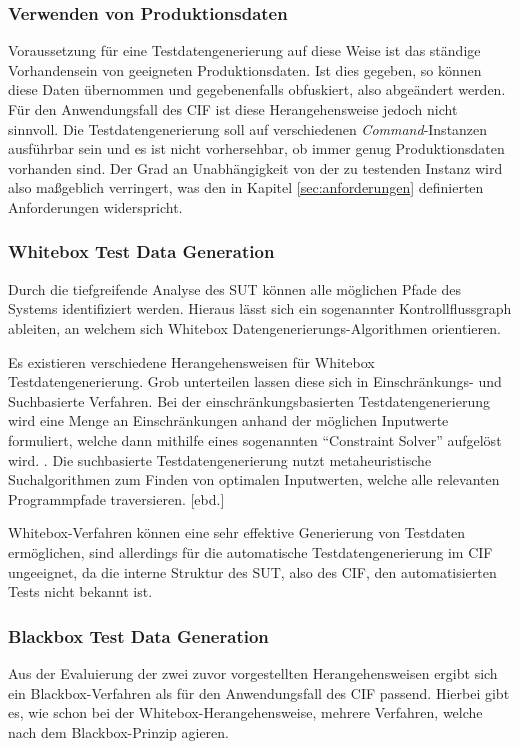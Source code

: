 \subsubsection*{Verwenden von Produktionsdaten}
Voraussetzung für eine Testdatengenerierung auf diese Weise ist das ständige Vorhandensein von geeigneten Produktionsdaten. Ist dies gegeben, so können diese Daten übernommen und gegebenenfalls obfuskiert, also abgeändert werden. \cite[S. 240]{witte:2019} Für den Anwendungsfall des \ac{CIF} ist diese Herangehensweise jedoch nicht sinnvoll. Die Testdatengenerierung soll auf verschiedenen \textit{Command}-Instanzen ausführbar sein und es ist nicht vorhersehbar, ob immer genug Produktionsdaten vorhanden sind. Der Grad an Unabhängigkeit von der zu testenden Instanz wird also maßgeblich verringert, was den in Kapitel \ref{sec:anforderungen} definierten Anforderungen widerspricht.

\subsubsection*{Whitebox Test Data Generation}
 Durch die tiefgreifende Analyse des \ac{SUT} können alle möglichen Pfade des Systems identifiziert werden. Hieraus lässt sich ein sogenannter Kontrollflussgraph ableiten, an welchem sich Whitebox Datengenerierungs-Algorithmen orientieren. \cite[S. 32]{nimpa:2016}

 Es existieren verschiedene Herangehensweisen für Whitebox Testdatengenerierung. Grob unterteilen lassen diese sich in Einschränkungs- und Suchbasierte Verfahren. Bei der einschränkungsbasierten Testdatengenerierung wird eine Menge an Einschränkungen anhand der möglichen Inputwerte formuliert, welche dann mithilfe eines sogenannten \enquote{Constraint Solver} aufgelöst wird. \cite[S. 33]{nimpa:2016}. Die suchbasierte Testdatengenerierung nutzt metaheuristische Suchalgorithmen zum Finden von optimalen Inputwerten, welche alle relevanten Programmpfade traversieren. [ebd.]

 Whitebox-Verfahren können eine sehr effektive Generierung von Testdaten ermöglichen, sind allerdings für die automatische Testdatengenerierung im \ac{CIF} ungeeignet, da die interne Struktur des \ac{SUT}, also des \ac{CIF}, den automatisierten Tests nicht bekannt ist.

\subsubsection*{Blackbox Test Data Generation}
Aus der Evaluierung der zwei zuvor vorgestellten Herangehensweisen ergibt sich ein Blackbox-Verfahren als für den Anwendungsfall des \ac{CIF} passend. Hierbei gibt es, wie schon bei der Whitebox-Herangehensweise, mehrere Verfahren, welche nach dem Blackbox-Prinzip agieren.

